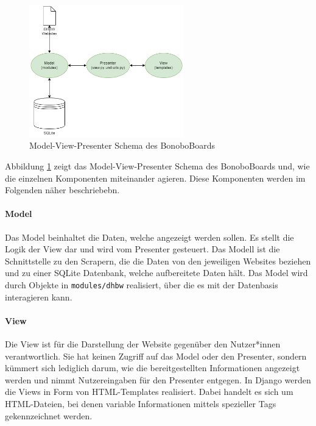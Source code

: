 \documentclass[a4paper,11pt]{scrartcl}
\begin{document}
\begin{figure}[H]
\begin{center}
	\includegraphics[width=0.6\textwidth]{MVP}
	\caption{Model-View-Presenter Schema des BonoboBoards}
	\label{img:MVP}
\end{center}
\end{figure}


Abbildung \ref{img:MVP} zeigt das Model-View-Presenter Schema des BonoboBoards und, wie die einzelnen Komponenten miteinander agieren. Diese Komponenten werden im Folgenden näher beschriebebn.

\paragraph{Model}
Das Model beinhaltet die Daten, welche angezeigt werden sollen. Es stellt die Logik der View dar und wird vom Presenter gesteuert. Das Modell ist die Schnittstelle zu den Scrapern, die die Daten von den jeweiligen Websites beziehen und zu einer SQLite Datenbank, welche aufbereitete Daten hält. Das Model wird durch Objekte in \texttt{modules/dhbw} realisiert, über die es mit der Datenbasis interagieren kann.

\paragraph{View}
Die View ist für die Darstellung der Website gegenüber den Nutzer*innen verantwortlich. Sie hat keinen Zugriff auf das Model oder den Presenter, sondern kümmert sich lediglich darum, wie die bereitgestellten Informationen angezeigt werden und nimmt Nutzereingaben für den Presenter entgegen. In Django werden die Views in Form von HTML-Templates realisiert. Dabei handelt es sich um HTML-Dateien, bei denen variable Informationen mittels spezieller Tags gekennzeichnet werden.
\end{document}
